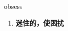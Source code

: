 
\begin{frame}
{\huge obsess}
\begin{center}
\begin{enumerate}\Large
  \item \textbf{迷住的，使困扰}
\end{enumerate}
\end{center}
\end{frame}
